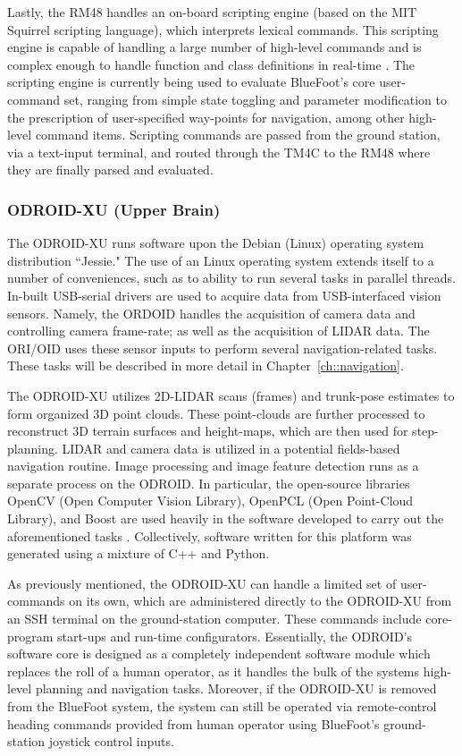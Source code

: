 			Lastly, the RM48 handles an on-board scripting engine (based on the MIT Squirrel scripting language), which interprets lexical commands. This scripting engine is capable of handling a large number of high-level commands and is complex enough to handle function and class definitions in real-time \cite{Squirrel_website}. The scripting engine is currently being used to evaluate BlueFoot's core user-command set, ranging from simple state toggling and parameter modification to the prescription of user-specified way-points for navigation, among other high-level command items. Scripting commands are passed from the ground station, via a text-input terminal, and routed through the TM4C to the RM48 where they are finally parsed and evaluated.

		\subsubsection{ODROID-XU (Upper Brain)}

			The ODROID-XU runs software upon the Debian (Linux) operating system distribution ``Jessie." The use of an Linux operating system extends itself to a number of conveniences, such as to ability to run several tasks in parallel threads. In-built USB-serial drivers are used to acquire data from USB-interfaced vision sensors. Namely, the ORDOID handles the acquisition of camera data and controlling camera frame-rate; as well as the acquisition of LIDAR data. The ORI/OID uses these sensor inputs to perform several navigation-related tasks. These tasks will be described in more detail in Chapter~\ref{ch::navigation}.

			The ODROID-XU utilizes 2D-LIDAR scans (frames) and trunk-pose estimates to form organized 3D point clouds. These point-clouds are further processed to reconstruct 3D terrain surfaces and height-maps, which are then used for step-planning. LIDAR and camera data is utilized in a potential fields-based navigation routine. Image processing and image feature detection runs as a separate process on the ODROID. In particular, the open-source libraries OpenCV (Open Computer Vision Library), OpenPCL (Open Point-Cloud Library), and Boost are used heavily in the software developed to carry out the aforementioned tasks \cite{opencv_library,openpcl_library,boost_website}. Collectively, software written for this platform was generated using a mixture of C++ and Python.

			As previously mentioned, the ODROID-XU can handle a limited set of user-commands on its own, which are administered directly to the ODROID-XU from an SSH terminal on the ground-station computer. These commands include core-program start-ups and run-time configurators. Essentially, the ODROID's software core is designed as a completely independent software module which replaces the roll of a human operator, as it handles the bulk of the systems high-level planning and navigation tasks. Moreover, if the ODROID-XU is removed from the BlueFoot system, the system can still be operated via remote-control heading commands provided from human operator using BlueFoot's ground-station joystick control inputs.
		
